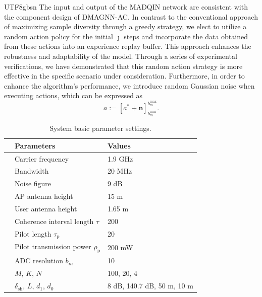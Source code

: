 \documentclass[lettersize,journal]{IEEEtran}
\begin{document}
\begin{CJK}{UTF8}{gbsn}
The input and output of the MADQIN network are consistent with the component design of DMAGNN-AC. 
In contrast to the conventional approach of maximizing sample diversity through a greedy strategy, we elect to utilize a random action policy for the initial $ \jmath $ steps and incorporate the data obtained from these actions into an experience replay buffer. This approach enhances the robustness and adaptability of the model. Through a series of experimental verifications, we have demonstrated that this random action strategy is more effective in the specific scenario under consideration. Furthermore, in order to enhance the algorithm's performance, we introduce random Gaussian noise when executing actions, which can be expressed as
\begin{equation}a := \left [ a^*+\mathbf{n} \right   ]^{b_m^\text{max}}_{b_m^\text{min}} .\end{equation}

\begin{table}[t]
  \begin{center}\label{table1}
    \caption{System basic parameter settings.}
    \begin{tabular}{@{}lll@{}}
			\toprule
                          & \textbf{Parameters}                        & \textbf{Values} \\ \midrule
 							    				 & Carrier frequency                   	& 1.9 GHz             \\
                          & Bandwidth                    				 	& 20 MHz          \\
                          & Noise figure           & 9 dB   \\
                          & AP antenna height & 15 m     \\
                          & User antenna height   & 1.65 m           \\
                          & Coherence interval length $\tau$        & 200\\
                          & Pilot length $\tau_\text{p}$   & 20  \\
                          & Pilot transmission power $\rho_\text{p}$              & 200 mW             \\
                          & ADC resolution $b_m$            &10   \\
                          & $M$, $K$, $N$    & 100, 20, 4\\
                          &$\delta _\text{sh}$, $L$, $d_1$, $d_0$   & 8 dB, 140.7 dB, 50 m, 10 m     \\\midrule
			\end{tabular}
  \end{center}
\end{table}


\end{CJK}
\end{document}
